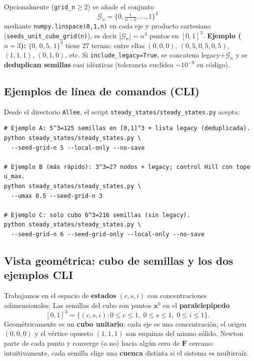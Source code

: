 \documentclass[11pt,a4paper]{article}
\begin{document}
Opcionalmente (\texttt{grid\_n}$\geq 2$) se añade el conjunto
\[
\mathcal{G}_n = \{0,\tfrac{1}{n-1},\ldots,1\}^3
\]
mediante \texttt{numpy.linspace(0,1,n)} en cada eje y producto cartesiano (\texttt{seeds\_unit\_cube\_grid(n)}), es decir $|\mathcal{G}_n|=n^3$ puntos en $[0,1]^3$.
\textbf{Ejemplo ($n=3$):} $\{0,\,0{,}5,\,1\}^3$ tiene $27$ ternas; entre ellas $(0,0,0)$, $(0{,}5,0{,}5,0{,}5)$, $(1,1,1)$, $(0,1,0)$, etc.
Si \texttt{include\_legacy=True}, se concatena legacy$+\mathcal{G}_n$ y se \textbf{deduplican semillas} casi idénticas (tolerancia euclídea $\sim 10^{-9}$ en código).

\subsection{Ejemplos de línea de comandos (CLI)}

Desde el directorio \texttt{Allee}, el script \texttt{steady\_states/steady\_states.py} acepta:

\begin{verbatim}
# Ejemplo A: 5^3=125 semillas en [0,1]^3 + lista legacy (deduplicada).
python steady_states/steady_states.py \
  --seed-grid-n 5 --local-only --no-save

# Ejemplo B (más rápido): 3^3=27 nodos + legacy; control Hill con tope u_max.
python steady_states/steady_states.py \
  --umax 0.5 --seed-grid-n 3

# Ejemplo C: solo cubo 6^3=216 semillas (sin legacy).
python steady_states/steady_states.py \
  --seed-grid-n 6 --seed-grid-only --local-only --no-save
\end{verbatim}

\subsection{Vista geométrica: cubo de semillas y los dos ejemplos CLI}

Trabajamos en el espacio de \textbf{estados} $(c,s,i)$ con concentraciones adimensionales. Las semillas del cubo son puntos $\mathbf{x}^0$ en el \textbf{paralelepípedo}
\[
[0,1]^3 = \{(c,s,i): 0\leq c\leq 1,\; 0\leq s\leq 1,\; 0\leq i\leq 1\}.
\]
Geométricamente es un \textbf{cubo unitario}: cada eje es una concentración; el origen $(0,0,0)$ y el vértice opuesto $(1,1,1)$ son esquinas del mismo sólido. Newton parte de cada punto y converge (o no) hacia algún cero de $\mathbf{F}$ cercano: intuitivamente, cada semilla elige una \textbf{cuenca} distinta si el sistema es multirraíz.
\end{document}
